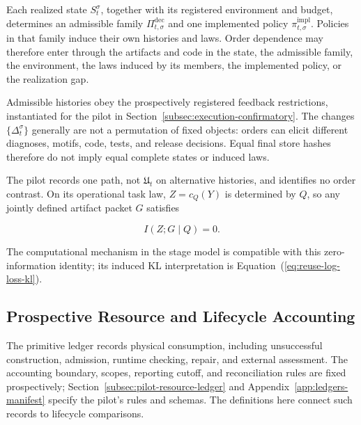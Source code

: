 \documentclass[10pt]{article} %
\renewcommand{\eqref}[1]{\textup{(\ref{#1})}}
\providecommand{\1}{\mathbf{1}}  %
\theoremstyle{remark}
\theoremstyle{definition}
\begin{document}
Each realized state $S_t^\sigma$, together with its registered environment and budget, determines an admissible family $\Pi_{t,\sigma}^{\mathrm{dec}}$ and one implemented policy $\pi_{t,\sigma}^{\mathrm{impl}}$. Policies in that family induce their own histories and laws. Order dependence may therefore enter through the artifacts and code in the state, the admissible family, the environment, the laws induced by its members, the implemented policy, or the realization gap.

Admissible histories obey the prospectively registered feedback
restrictions, instantiated for the pilot in
Section~\ref{subsec:execution-confirmatory}. The changes
$\{\Delta_t^\sigma\}$ generally are not a permutation of fixed objects:
orders can elicit different diagnoses, motifs, code, tests, and release
decisions. Equal final store hashes therefore do not imply equal
complete states or induced laws.

The pilot records one path, not $\mathfrak U_t$ on alternative histories,
and identifies no order contrast. On its operational task law,
$Z=c_Q(Y)$ is determined by $Q$, so any jointly defined artifact packet
$G$ satisfies

\begin{equation}
I(Z;G\mid Q)=0.
\end{equation}

The computational mechanism in the stage model is compatible with this
zero-information identity; its induced KL interpretation is
Equation~\eqref{eq:reuse-log-loss-kl}.

\subsection{Prospective Resource and Lifecycle Accounting}
\label{subsec:adaptive-resource-accounting}

The primitive ledger records physical consumption, including unsuccessful
construction, admission, runtime checking, repair, and external
assessment. The accounting boundary, scopes, reporting cutoff, and
reconciliation rules are fixed prospectively;
Section~\ref{subsec:pilot-resource-ledger} and
Appendix~\ref{app:ledgers-manifest} specify the pilot's rules and schemas.
The definitions here connect such records to lifecycle comparisons.
\end{document}
